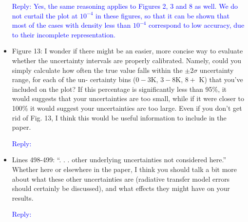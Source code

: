 \documentclass[11pt,a4paper,draft]{article}
\begin{document}
\begin{itemize}
\textcolor{blue}{Reply: Yes, the same reasoning applies to Figures 2, 3 and 8 as well. We do not curtail the plot at $10^{-4}$ in these figures, so that it can be shown that most of the cases with density less than $10^{-4}$ correspond to low accuracy, due to their incomplete representation.}


\item 
			Figure 13: I wonder if there might be an easier, more concise way to evaluate whether
			the uncertainty intervals are properly calibrated. Namely, could you simply calculate
			how often the true value falls within the $\pm2\sigma$ uncertainty range, for each of the un-
			certainty bins ($0 - 3$K, $3 - 8$K, $8 +$ K) that you've included on the plot? If this percentage
			is significantly less than 95\%, it would suggests that your uncertainties are too small,
			while if it were closer to 100\% it would suggest your uncertainties are too large. Even
			if you don't get rid of Fig. 13, I think this would be useful information to include in the paper.

\textcolor{blue}{Reply:}

\item  
			Lines 498-499: ``. . . other underlying uncertainties not considered here.'' Whether here or elsewhere in the paper, I think you should talk a bit more about what these other uncertainties are (radiative transfer model errors should certainly be discussed), and what effects they might have on your results.

\textcolor{blue}{Reply:}

\end{itemize}
	
\end{document}

